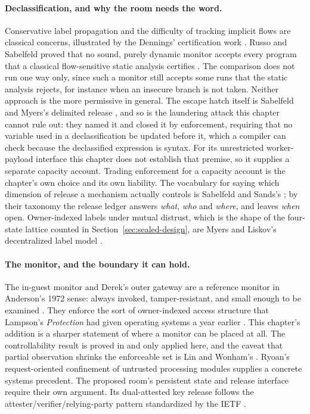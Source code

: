 \documentclass[11pt,a4paper]{article}
\theoremstyle{definition}
\begin{document}
\paragraph{Declassification, and why the room needs the word.}
Conservative label propagation and the difficulty of tracking implicit flows
are classical concerns, illustrated by the Dennings' certification work
. Russo and Sabelfeld proved that no sound, purely
dynamic monitor accepts every program that a classical flow-sensitive static
analysis certifies . The comparison does not run one way only,
since such a monitor still accepts some runs that the static analysis rejects,
for instance when an insecure branch is not taken. Neither approach is the
more permissive in general. The escape hatch itself
is Sabelfeld and Myers's delimited release , and so
is the laundering attack this chapter cannot rule out: they named it and closed
it by enforcement, requiring that no variable used in a declassification be
updated before it, which a compiler can check because the declassified
expression is syntax. For its unrestricted worker-payload interface this chapter does not establish
that premise, so it supplies a separate capacity account. Trading
enforcement for a capacity account is the chapter's own choice and its own
liability. The vocabulary for saying which
dimension of release a mechanism actually controls is Sabelfeld and Sands's
; by their taxonomy the release ledger answers \emph{what},
\emph{who} and \emph{where}, and leaves \emph{when} open. Owner-indexed labels
under mutual distrust, which is the shape of the four-state lattice counted in
Section~\ref{sec:sealed-design}, are Myers and Liskov's decentralized label
model .

\paragraph{The monitor, and the boundary it can hold.}
The in-guest monitor and Derek's outer gateway are a reference monitor in
Anderson's 1972 sense: always invoked, tamper-resistant, and small enough to be
examined . They enforce the sort of owner-indexed access
structure that Lampson's \emph{Protection} had given operating systems a year
earlier . This chapter's addition is a sharper statement of where
a monitor can be placed at all. The controllability result is proved in
 and only applied here, and the
caveat that partial observation
shrinks the enforceable set is Lin and Wonham's . Ryoan's request-oriented confinement of untrusted processing modules
 supplies a concrete systems precedent. The proposed room's
persistent state and release interface require their own argument. Its
dual-attested key release follows the attester/verifier/relying-party pattern
standardized by the IETF .
\end{document}
